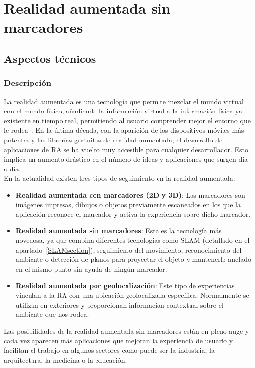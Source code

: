 \chapter{ Realidad aumentada sin marcadores }\label{RASinMarcadores}

\section{Aspectos técnicos}
\subsection{Descripción}
La realidad aumentada es una tecnología que permite mezclar el mundo virtual con el mundo físico, añadiendo la información virtual a la información física ya existente en tiempo real, permitiendo al usuario comprender mejor el entorno que le rodea~\cite{ARCarmigniani}. En la última década, con la aparición de los dispositivos móviles más potentes y las librerías gratuitas de realidad aumentada, el desarrollo de aplicaciones de RA se ha vuelto muy accesible para cualquier desarrollador. Esto implica un aumento drástico en el número de ideas y aplicaciones que surgen día a día.\\

En la actualidad existen tres tipos de seguimiento en la realidad aumentada:
\begin{itemize}
\item \textbf{Realidad aumentada con marcadores (2D y 3D)}: Los marcadores son imágenes impresas, dibujos o objetos previamente escaneados en los que la aplicación reconoce el marcador y activa la experiencia sobre dicho marcador. 

\item \textbf{Realidad aumentada sin marcadores}: Esta es la tecnología más novedosa, ya que combina diferentes tecnologías como SLAM (detallado en el apartado~\ref{SLAMsection}), seguimiento del movimiento, reconocimiento del ambiente o detección de planos para proyectar el objeto y mantenerlo anclado en el mismo punto sin ayuda de ningún marcador.

\item \textbf{Realidad aumentada por geolocalización}: Este tipo de experiencias vinculan a la RA con una ubicación geolocalizada específica. Normalmente se utilizan en exteriores y proporcionan información contextual sobre el ambiente que nos rodea.
\end{itemize}
Las posibilidades de la realidad aumentada sin marcadores están en pleno auge y cada vez aparecen más aplicaciones que mejoran la experiencia de usuario y facilitan el trabajo en algunos sectores como puede ser la industria, la arquitectura, la medicina o la educación.

